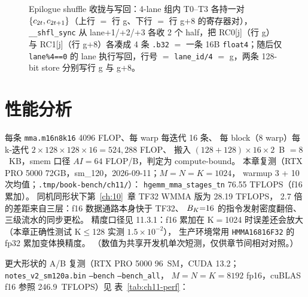 \begin{figure}[H]
\caption{Epilogue shuffle 收拢与写回：4-lane 组内 T0--T3 各持一对 $\{c\sb{2t},c\sb{2t+1}\}$（上行 $=$ 行 g、下行 $=$ 行 g{+}8 的寄存器对），\texttt{\_\_shfl\_sync} 从 lane+1/+2/+3 各收 2 个 half，把 RC0[j]（行 g）与 RC1[j]（行 g{+}8）各凑成 4 条 \texttt{.b32} $=$ 一条 16B \texttt{float4}；随后仅 \texttt{lane\%4==0} 的 lane 执行写回，行号 $=$ \texttt{lane\_id/4} $=$ g，两条 128-bit store 分别写行 g 与 g{+}8。}
\label{fig:11-epilogue-shuffle}
\end{figure}
\section{性能分析}

每条 \texttt{mma.\allowbreak{}m16n8k16} 4096 FLOP、每 warp 每迭代 16 条、
每 block（8 warp）每 k-迭代 $2\times128\times128\times16 = 524{,}288$ FLOP、
搬入 $(128{+}128)\times16\times2$~B $= 8$~KB，smem 口径
$AI = 64$ FLOP/B，判定为 compute-bound。
本章复测（RTX PRO 5000 72GB，sm\_120，2026-09-11；$M{=}N{=}K{=}1024$，
warmup 3 + 10 次均值；\texttt{.\allowbreak{}tmp/\allowbreak{}book-bench/\allowbreak{}ch11/\allowbreak{}}）：
\texttt{hgemm\_\allowbreak{}mma\_\allowbreak{}stages\_\allowbreak{}tn} 76.55 TFLOPS（f16 累加）。
同机同形状下第~\ref{ch:10}~章 TF32 WMMA 版为 28.19 TFLOPS，
2.7 倍的差距来自三层：f16 数据通路本身快于 TF32、
$B\sb K{=}16$ 的指令发射密度翻倍、三级流水的同步更松。
精度口径见 11.3.1：f16 累加在 K$=$1024 时误差还会放大
（本章正确性测试 K$\le$128 实测 $1.5\times10^{-2}$），
生产环境常用 \texttt{HMMA16816\allowbreak{}F32} 的 fp32 累加变体换精度。
（数值为共享开发机单次短测，仅供章节间相对对照。）

更大形状的 A/B 复测（RTX PRO 5000 96~SM，CUDA 13.2；
\texttt{notes\_\allowbreak{}v2\_\allowbreak{}sm120a.\allowbreak{}bin}
\texttt{--bench} \texttt{--bench\_\allowbreak{}all}，
$M{=}N{=}K{=}8192$ fp16，cuBLAS f16 参照 246.9~TFLOPS）见
表~\ref{tab:ch11-perf}：

